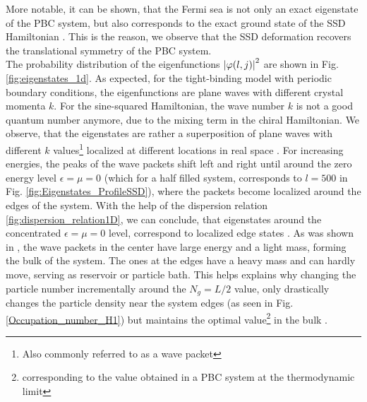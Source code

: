 \documentclass[11pt, a4paper, oneside]{book}
\theoremstyle{definition} %
\begin{document}
More notable, it can be shown, that the Fermi sea is not only an exact eigenstate of the PBC system, but also corresponds to the exact ground state of the SSD Hamiltonian \cite{Katsura}\cite{Maruyama}. This is the reason, we observe that the SSD deformation recovers the translational symmetry of the PBC system. \\

The probability distribution of the eigenfunctions $\abs{\varphi(l,j)}^2$ are shown in Fig. \ref{fig:eigenstates_1d}. As expected, for the tight-binding model with periodic boundary conditions, the eigenfunctions are plane waves with different crystal momenta $k$. For the sine-squared Hamiltonian, the wave number $k$ is not a good quantum number anymore, due to the mixing term in the chiral Hamiltonian. We observe, that the eigenstates are rather a superposition of plane waves with different $k$ values\footnote{Also commonly referred to as a wave packet} localized at different locations in real space \cite{Hotta}. For increasing energies, the peaks of the wave packets shift left and right until around the zero energy level $\epsilon = \mu = 0$ (which for a half filled system, corresponds to $l = 500$ in Fig. \ref{fig:Eigenstates_ProfileSSD}), where the packets become localized around the edges of the system. With the help of the dispersion relation \ref{fig:dispersion_relation1D}, we can conclude, that eigenstates around the concentrated $\epsilon = \mu = 0$ level, correspond to localized edge states \cite{Hotta}. As was shown in \cite{Hotta}, the wave packets in the center have large energy and a light mass, forming the bulk of the system. The ones at the edges have a heavy mass and can hardly move, serving as reservoir or particle bath. This helps explains why changing the particle number incrementally around the $N_g = L/2$ value, only drastically changes the particle density near the system edges (as seen in Fig. \ref{Occupation_number_H1}) but maintains the optimal value\footnote{corresponding to the value obtained in a PBC system at the thermodynamic limit} in the bulk \cite{Hotta}.
\end{document}
